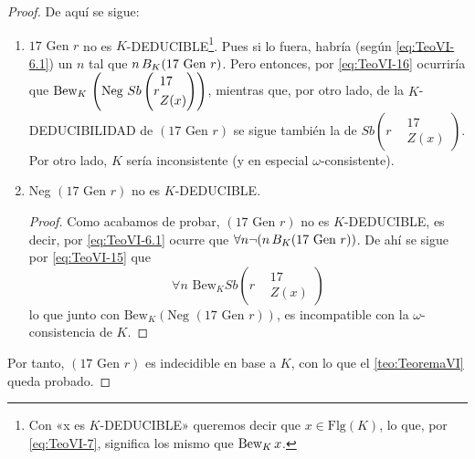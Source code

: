 \begin{proof}
    De aquí se sigue:
    \begin{enumerate}
        \item   $17 \text{ Gen } r$ no es $K$-DEDUCIBLE\footnote{Con «x es $K$-DEDUCIBLE» queremos decir que $x \in \text{Flg}(K)$, lo que, por \eqref{eq:TeoVI-7},
                significa los mismo que $\text{Bew}_K \thinspace x$.}. Pues si lo fuera, habría (según \eqref{eq:TeoVI-6.1}) un $n$ tal que 
                $n \thinspace B_K (17 \text{ Gen } r)$. Pero entonces, por \autoref{eq:TeoVI-16} ocurriría que 
                $\text{Bew}_K \thinspace \left(\text{Neg } Sb\left(r
                \begin{aligned}
                    &17 \\
                    &Z(x)
                \end{aligned}
                \right)\right)$, 
                mientras que, por otro lado, de la $K$-DEDUCIBILIDAD de $(17 \text{ Gen } r)$ se sigue también la de 
                $Sb\left(r
                \begin{aligned}
                    &17 \\
                    &Z(x)
                \end{aligned}
                \right)$.
                Por otro lado, $K$ sería inconsistente (y en especial $\omega$-consistente).
        \item Neg $(17 \text{ Gen } r)$ no es $K$-DEDUCIBLE.
                \begin{proof}
                    Como acabamos de probar, $(17 \text{ Gen } r)$ no es $K$-DEDUCIBLE, es decir, por \eqref{eq:TeoVI-6.1} ocurre que 
                    $\forall n \lnot (n \thinspace B_K (17 \text{ Gen } r))$. De ahí se sigue por \eqref{eq:TeoVI-15} que
                    $$\forall n \text{ Bew}_K Sb\left(r
                    \begin{aligned}
                        &17 \\
                        &Z(x)
                    \end{aligned}
                    \right)$$
                    lo que junto con $\text{Bew}_K(\text{Neg }  (17 \text{ Gen } r))$, es incompatible con la $\omega$-consistencia de $K$.
                \end{proof}
    \end{enumerate}

    Por tanto, $(17 \text{ Gen } r)$ es indecidible en base a $K$, con lo que el \autoref{teo:TeoremaVI} queda probado.
\end{proof}

